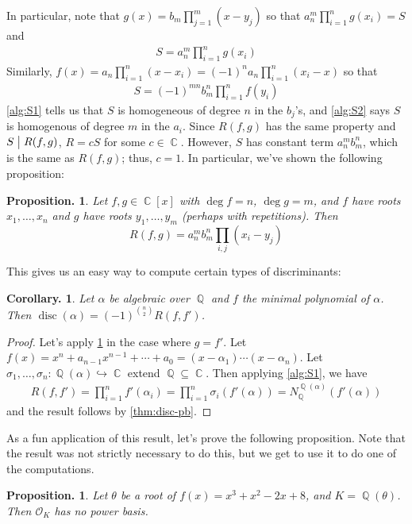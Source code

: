 \documentclass[11pt, a4paper]{memoir}
\DeclareMathOperator{\Q}{{\mathbb{Q}}}
\DeclareMathOperator{\C}{{\mathbb{C}}}
\newcommand{\hto}[0]{\ensuremath{\hookrightarrow}}
\renewcommand{\div}{\bigm|}
\theoremstyle{change}
\newtheorem{corollary}[theorem]{Corollary.}
\newtheorem{proposition}[theorem]{Proposition.}
\theoremstyle{plain}
\theoremstyle{nonumberplain}
\newtheorem{proof}{Proof}
\DeclareMathOperator{\disc}{disc}
\numberwithin{equation}{section}
\begin{document}
In particular, note that $g(x)=b_m\prod_{j=1}^m(x-y_j)$ so that $a_n^m\prod_{i=1}^ng(x_i)=S$ and
\begin{align}
    S=a_n^m\prod_{i=1}^ng(x_i)\label{alg:S1}
\end{align}
Similarly, $f(x)=a_n\prod_{i=1}^n(x-x_i)=(-1)^na_n\prod_{i=1}^n(x_i-x)$ so that
\begin{align}
    S=(-1)^{mn}b_m^n\prod_{i=1}^nf(y_i)\label{alg:S2}
\end{align}
\cref{alg:S1} tells us that $S$ is homogeneous of degree $n$ in the $b_j$'s, and \cref{alg:S2} says $S$ is homogenous of degree $m$ in the $a_i$.
Since $R(f,g)$ has the same property and $S\div R(f,g)$, $R=cS$ for some $c\in\C$.
However, $S$ has constant term $a_n^mb_m^n$, which is the same as $R(f,g)$; thus, $c=1$.
In particular, we've shown the following proposition:
\begin{proposition}\label{prop:res-alt}
    Let $f,g\in\C[x]$ with $\deg f=n$, $\deg g=m$, and $f$ have roots $x_1,\ldots,x_n$ and $g$ have roots $y_1,\ldots,y_m$ (perhaps with repetitions).
    Then
    \begin{equation*}
        \displaystyle R(f,g)=a_n^mb_m^n\prod_{i,j}(x_i-y_j)
    \end{equation*}
\end{proposition}
This gives us an easy way to compute certain types of discriminants:
\begin{corollary}
    Let $\alpha$ be algebraic over $\Q$ and $f$ the minimal polynomial of $\alpha$.
    Then $\disc(\alpha)=(-1)^{\binom{n}{2}}R(f,f')$.
\end{corollary}
\begin{proof}
    Let's apply \cref{prop:res-alt} in the case where $g=f'$.
    Let $f(x)=x^n+a_{n-1}x^{n-1}+\cdots+a_0=(x-\alpha_1)\cdots(x-\alpha_n)$.
    Let $\sigma_1,\ldots,\sigma_n:\Q(\alpha)\hto\C$ extend $\Q\subseteq\C$.
    Then applying \cref{alg:S1}, we have
    \begin{align*}
        R(f,f')=\prod_{i=1}^n f'(\alpha_i)=\prod_{i=1}^n\sigma_i(f'(\alpha))=N_{\Q}^{\Q(\alpha)}(f'(\alpha))
    \end{align*}
    and the result follows by \cref{thm:disc-pb}.
\end{proof}
As a fun application of this result, let's prove the following proposition.
Note that the result was not strictly necessary to do this, but we get to use it to do one of the computations.
\begin{proposition}
    Let $\theta$ be a root of $f(x)=x^3+x^2-2x+8$, and $K=\Q(\theta)$.
    Then $\mathcal{O}_K$ has no power basis.
\end{proposition}
\end{document}
